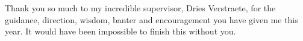 \begin{dedication} 



Thank you so much to my incredible supervisor, Dries Verstraete, for the guidance, direction, wisdom, banter and encouragement you have given me this year. It would have been impossible to finish this without you.


\end{dedication}

